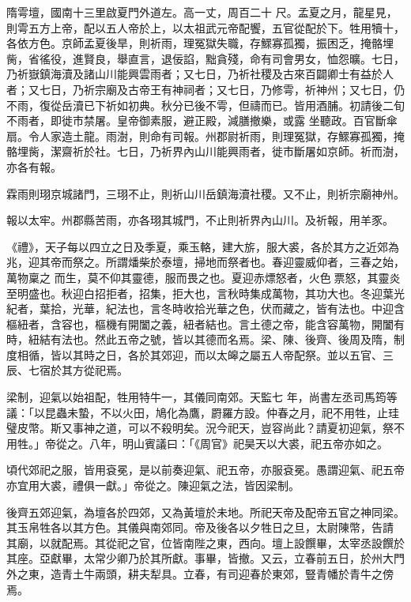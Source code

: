 \begin{pinyinscope}
 隋雩壇，國南十三里啟夏門外道左。高一丈，周百二十
 尺。孟夏之月，龍星見，則雩五方上帝，配以五人帝於上，以太祖武元帝配饗，五官從配於下。牲用犢十，各依方色。京師孟夏後旱，則祈雨，理冤獄失職，存鰥寡孤獨，振困乏，掩骼埋胔，省徭役，進賢良，舉直言，退佞諂，黜貪殘，命有司會男女，恤怨曠。七日，乃祈嶽鎮海瀆及諸山川能興雲雨者；又七日，乃祈社稷及古來百闢卿士有益於人者；又七日，乃祈宗廟及古帝王有神祠者；又七日，乃修雩，祈神州；又七日，仍不雨，復從岳瀆已下祈如初典。秋分已後不雩，但禱而已。皆用酒脯。初請後二旬不雨者，即徙市禁屠。皇帝御素服，避正殿，減膳撤樂，或露
 坐聽政。百官斷傘扇。令人家造土龍。雨澍，則命有司報。州郡尉祈雨，則理冤獄，存鰥寡孤獨，掩骼埋胔，潔齋祈於社。七日，乃祈界內山川能興雨者，徙市斷屠如京師。祈而澍，亦各有報。



 霖雨則珝京城諸門，三珝不止，則祈山川岳鎮海瀆社稷。又不止，則祈宗廟神州。



 報以太牢。州郡縣苦雨，亦各珝其城門，不止則祈界內山川。及祈報，用羊豕。



 《禮》，天子每以四立之日及季夏，乘玉輅，建大旂，服大裘，各於其方之近郊為兆，迎其帝而祭之。所謂燔柴於泰壇，掃地而祭者也。春迎靈威仰者，三春之始，萬物稟之
 而生，莫不仰其靈德，服而畏之也。夏迎赤熛怒者，火色票怒，其靈炎至明盛也。秋迎白招拒者，招集，拒大也，言秋時集成萬物，其功大也。冬迎葉光紀者，葉拾，光華，紀法也，言冬時收拾光華之色，伏而藏之，皆有法也。中迎含樞紐者，含容也，樞機有開闔之義，紐者結也。言土德之帝，能含容萬物，開闔有時，紐結有法也。然此五帝之號，皆以其德而名焉。梁、陳、後齊、後周及隋，制度相循，皆以其時之日，各於其郊迎，而以太皞之屬五人帝配祭。並以五官、三辰、七宿於其方從祀焉。



 梁制，迎氣以始祖配，牲用特牛一，其儀同南郊。天監七
 年，尚書左丞司馬筠等議：「以昆蟲未蟄，不以火田，鳩化為鷹，罻羅方設。仲春之月，祀不用牲，止珪璧皮幣。斯又事神之道，可以不殺明矣。況今祀天，豈容尚此？請夏初迎氣，祭不用牲。」帝從之。八年，明山賓議曰：「《周官》祀昊天以大裘，祀五帝亦如之。



 頃代郊祀之服，皆用袞冕，是以前奏迎氣、祀五帝，亦服袞冕。愚謂迎氣、祀五帝亦宜用大裘，禮俱一獻。」帝從之。陳迎氣之法，皆因梁制。



 後齊五郊迎氣，為壇各於四郊，又為黃壇於未地。所祀天帝及配帝五官之神同梁。其玉帛牲各以其方色。其儀與南郊同。帝及後各以夕牲日之旦，太尉陳幣，告請
 其廟，以就配焉。其從祀之官，位皆南陛之東，西向。壇上設饌畢，太宰丞設饌於其座。亞獻畢，太常少卿乃於其所獻。事畢，皆撤。又云，立春前五日，於州大門外之東，造青土牛兩頭，耕夫犁具。立春，有司迎春於東郊，豎青幡於青牛之傍焉。




\end{pinyinscope}
